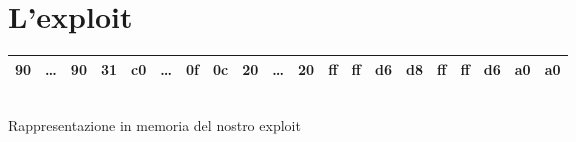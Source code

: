 \documentclass[a4paper,12pt]{report}
\begin{document}
	\vspace{24pt}

\section*{L'exploit}
	\begin{center}
		\begin{tabular}{|c|c|c|c|c|c|c|c|c|c|c|c|c|c|c|c|c|c|c|c|}
			\hline 90 & \dots & 90 & 31 & c0 & \dots & 0f & 0c & 20 & \dots & 20 & ff & ff & d6 & d8 & ff & ff & d6 & a0 & a0 \\
			\hline
		\end{tabular} \\
		\small
		Rappresentazione in memoria del nostro exploit \\
	\end{center}
\end{document}
